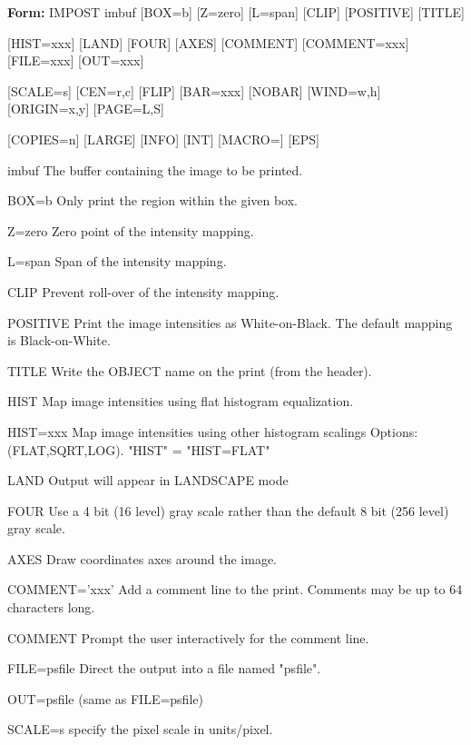 {\newpage\clearpage
{}%
\begin{command}
  \item[\textbf{Form: } IMPOST imbuf {[BOX=b]} {[Z=zero]} {[L=span]} {[CLIP]} 
       {[POSITIVE]} {[TITLE]}\hfill]{}
  \item[{[HIST=xxx]} {[LAND]} {[FOUR]} {[AXES]} {[COMMENT]} {[COMMENT=xxx]}
        {[FILE=xxx]} {[OUT=xxx]}]{}
  \item[{[SCALE=s]} {[CEN=r,c]} {[FLIP]} {[BAR=xxx]} {[NOBAR]} {[WIND=w,h]} 
        {[ORIGIN=x,y]} {[PAGE=L,S]}]{}
  \item[{[COPIES=n]} {[LARGE]} {[INFO]} {[INT]} {[MACRO=]} {[EPS]}]{}
  \item[imbuf]{The buffer containing the image to be printed.}
  \item[BOX=b]{Only print the region within the given box.}
  \item[Z=zero ]{Zero point of the intensity mapping.}
  \item[L=span ]{Span of the intensity mapping.  }
  \item[CLIP]{Prevent roll-over of the intensity mapping.}
  \item[POSITIVE ]{Print the image intensities as White-on-Black.
                   The default mapping is Black-on-White.}
  \item[TITLE ]{Write the OBJECT name on the print (from the header).}
  \item[HIST ]{Map image intensities using flat histogram equalization.}
  \item[HIST=xxx]{Map image intensities using other histogram scalings
                  Options: (FLAT,SQRT,LOG).  "HIST" = "HIST=FLAT"}
  \item[LAND ]{Output will appear in LANDSCAPE mode}
  \item[FOUR ]{Use a 4 bit (16 level) gray scale rather than the
               default 8 bit (256 level) gray scale.}
  \item[AXES ]{Draw coordinates axes around the image.}
  \item[COMMENT='xxx']{Add a comment line to the print.  Comments may be
                       up to 64 characters long. }
  \item[COMMENT ]{Prompt the user interactively for the comment line.}
  \item[FILE=psfile]{Direct the output into a file named "psfile".}
  \item[OUT=psfile]{(same as FILE=psfile)}
  \item[SCALE=s ]{specify the pixel scale in units/pixel.}

\end{command}}
